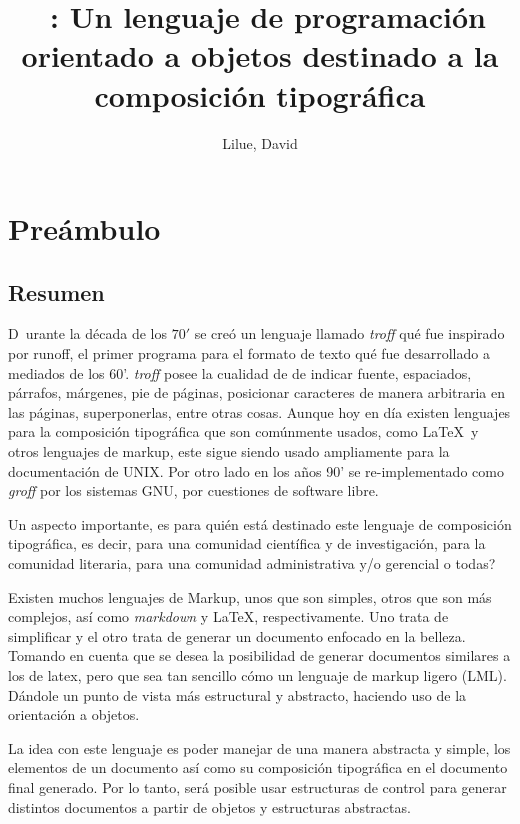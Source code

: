 \documentclass[12pt,letterpaper,titlepage,oneside,openright]{book}
\title{\ohtex \ : Un lenguaje de programación orientado a objetos destinado a la composición tipográfica}
\author{Lilue, David}
\newcommand{\nonumberchapter}[1]{
    \chapter*{#1}
    \addcontentsline{toc}{chapter}{#1}
}
\begin{document}
\frontmatter

\maketitle

\nonumberchapter{Preámbulo}

\section*{Resumen}

\lettrine[lines=2]{D}{}\ urante la década de los $70'$ se creó un lenguaje llamado \textit{troff} qué fue inspirado por
runoff, el primer programa para el formato de texto qué fue desarrollado a mediados
de los 60'. \textit{troff} posee la cualidad de de indicar fuente, espaciados,
párrafos, márgenes, pie de páginas, posicionar caracteres de manera arbitraria en las
páginas, superponerlas, entre otras cosas. Aunque hoy en día existen lenguajes para
la composición tipográfica que son comúnmente usados, como \LaTeX \ y otros lenguajes de
markup, este sigue siendo usado ampliamente para la documentación de UNIX. Por otro
lado en los años 90' se re-implementado como \textit{groff} por los sistemas GNU, por
cuestiones de software libre. 

Un aspecto importante, es para quién está destinado este lenguaje de composición
tipográfica, es decir, para una comunidad científica y de investigación, para la
comunidad literaria, para una comunidad administrativa y/o gerencial o todas? 

Existen muchos lenguajes de Markup, unos que son simples, otros que son más
complejos, así como \textit{markdown} y \LaTeX, respectivamente. Uno trata de
simplificar y el otro trata de generar un documento enfocado en la belleza. Tomando
en cuenta que se desea la posibilidad de generar documentos similares a los de latex,
pero que sea tan sencillo cómo un lenguaje de markup ligero (LML). Dándole un punto
de vista más estructural y abstracto, haciendo uso de la orientación a objetos.

La idea con este lenguaje es poder manejar de una manera abstracta y simple, los
elementos de un documento así como su composición tipográfica en el documento final
generado. Por lo tanto, será posible usar estructuras de control para generar
distintos documentos a partir de objetos y estructuras abstractas.

\end{document}
